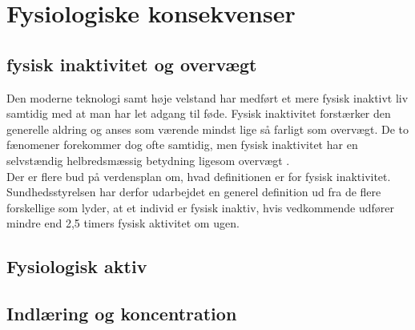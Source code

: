 \section{Fysiologiske konsekvenser}


\subsection{fysisk inaktivitet og overvægt}
Den moderne teknologi samt høje velstand har medført et mere fysisk inaktivt liv samtidig med at man har let adgang til føde. \cite{Kiens2007} Fysisk inaktivitet forstærker den generelle aldring og anses som værende mindst lige så farligt som overvægt. De to fænomener forekommer dog ofte samtidig, men fysisk inaktivitet har en selvstændig helbredsmæssig betydning ligesom overvægt \cite{Kaprio2008,Hjort1997,Kiens2007}.\\
Der er flere bud på verdensplan om, hvad definitionen er for fysisk inaktivitet. Sundhedsstyrelsen har derfor udarbejdet en generel definition ud fra de flere forskellige som lyder, at et individ er fysisk inaktiv, hvis vedkommende udfører mindre end 2,5 timers fysisk aktivitet om ugen. \cite{Kiens2007}

\subsection{Fysiologisk aktiv}


\subsection{Indlæring og koncentration}


